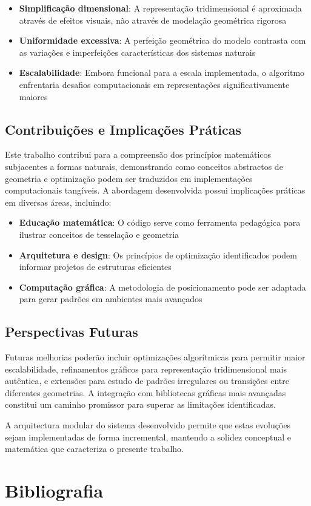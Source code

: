 \documentclass[12pt,a4paper,oneside]{extarticle}
\begin{document}
\begin{itemize}
    \item \textbf{Simplificação dimensional}: A representação tridimensional é aproximada através de efeitos visuais, não através de modelação geométrica rigorosa
    \item \textbf{Uniformidade excessiva}: A perfeição geométrica do modelo contrasta com as variações e imperfeições características dos sistemas naturais
    \item \textbf{Escalabilidade}: Embora funcional para a escala implementada, o algoritmo enfrentaria desafios computacionais em representações significativamente maiores
\end{itemize}

\subsection{Contribuições e Implicações Práticas}

Este trabalho contribui para a compreensão dos princípios matemáticos subjacentes a formas naturais, demonstrando como conceitos abstractos de geometria e optimização podem ser traduzidos em implementações computacionais tangíveis. A abordagem desenvolvida possui implicações práticas em diversas áreas, incluindo:

\begin{itemize}
    \item \textbf{Educação matemática}: O código serve como ferramenta pedagógica para ilustrar conceitos de tesselação e geometria
    \item \textbf{Arquitetura e design}: Os princípios de optimização identificados podem informar projetos de estruturas eficientes
    \item \textbf{Computação gráfica}: A metodologia de posicionamento pode ser adaptada para gerar padrões em ambientes mais avançados
\end{itemize}

\subsection{Perspectivas Futuras}

Futuras melhorias poderão incluir optimizações algorítmicas para permitir maior escalabilidade, refinamentos gráficos para representação tridimensional mais autêntica, e extensões para estudo de padrões irregulares ou transições entre diferentes geometrias. A integração com bibliotecas gráficas mais avançadas constitui um caminho promissor para superar as limitações identificadas.

A arquitectura modular do sistema desenvolvido permite que estas evoluções sejam implementadas de forma incremental, mantendo a solidez conceptual e matemática que caracteriza o presente trabalho.

\section{Bibliografia}
\printbibliography

\label{fim}
\end{document}
